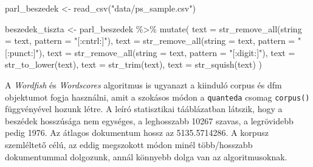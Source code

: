 \documentclass[
]{book}
\newenvironment{Shaded}{\begin{snugshade}}{\end{snugshade}}
\newcommand{\AttributeTok}[1]{\textcolor[rgb]{0.77,0.63,0.00}{#1}}
\newcommand{\FunctionTok}[1]{\textcolor[rgb]{0.00,0.00,0.00}{#1}}
\newcommand{\NormalTok}[1]{#1}
\newcommand{\OtherTok}[1]{\textcolor[rgb]{0.56,0.35,0.01}{#1}}
\newcommand{\SpecialCharTok}[1]{\textcolor[rgb]{0.00,0.00,0.00}{#1}}
\newcommand{\StringTok}[1]{\textcolor[rgb]{0.31,0.60,0.02}{#1}}
\begin{document}
\begin{Shaded}
\begin{Highlighting}[]
\NormalTok{parl\_beszedek }\OtherTok{\textless{}{-}} \FunctionTok{read\_csv}\NormalTok{(}\StringTok{"data/ps\_sample.csv"}\NormalTok{)}

\NormalTok{beszedek\_tiszta }\OtherTok{\textless{}{-}}\NormalTok{ parl\_beszedek }\SpecialCharTok{\%\textgreater{}\%} 
    \FunctionTok{mutate}\NormalTok{(}
    \AttributeTok{text =} \FunctionTok{str\_remove\_all}\NormalTok{(}\AttributeTok{string =}\NormalTok{ text, }\AttributeTok{pattern =} \StringTok{"[:cntrl:]"}\NormalTok{),}
    \AttributeTok{text =} \FunctionTok{str\_remove\_all}\NormalTok{(}\AttributeTok{string =}\NormalTok{ text, }\AttributeTok{pattern =} \StringTok{"[:punct:]"}\NormalTok{),}
    \AttributeTok{text =} \FunctionTok{str\_remove\_all}\NormalTok{(}\AttributeTok{string =}\NormalTok{ text, }\AttributeTok{pattern =} \StringTok{"[:digit:]"}\NormalTok{),}
    \AttributeTok{text =} \FunctionTok{str\_to\_lower}\NormalTok{(text),}
    \AttributeTok{text =} \FunctionTok{str\_trim}\NormalTok{(text),}
    \AttributeTok{text =} \FunctionTok{str\_squish}\NormalTok{(text)}
\NormalTok{  )}
\end{Highlighting}
\end{Shaded}

A \emph{Wordfish} és \emph{Wordscores} algoritmus is ugyanazt a kiinduló
corpus és dfm objektumot fogja használni, amit a szokásos módon a
\texttt{quanteda} csomag \texttt{corpus()} függvényével hozunk létre. A
leíró statisztikai tááblázatban látszik, hogy a beszédek hosszúsága nem
egységes, a leghosszabb 10267 szavas, a legrövidebb pedig 1976. Az
átlagos dokumentum hossz az 5135.5714286. A korpusz szemléltető célú, az
eddig megszokott módon minél több/hosszabb dokumentummal dolgozunk,
annál könnyebb dolga van az algoritmusoknak.
\end{document}
